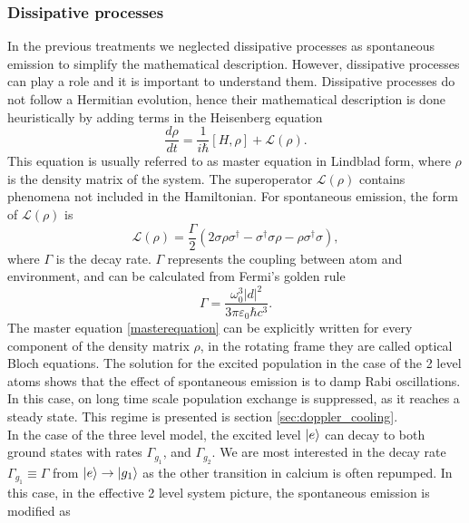 \subsubsection{Dissipative processes}
\label{sec:dissipation}
In the previous treatments we neglected dissipative processes as spontaneous emission to simplify the mathematical description. However, dissipative processes can play a role and it is important to understand them. Dissipative processes do not follow a Hermitian evolution, hence their mathematical description is done heuristically by adding terms in the Heisenberg equation
\begin{equation}
\label{masterequation}
\frac{d\rho}{dt} = \frac{1}{i\hbar}[H,\rho] + \mathcal{L}(\rho).
\end{equation}
This equation is usually referred to as master equation in Lindblad form, where $\rho$ is the density matrix of the system. The superoperator
$\mathcal{L}(\rho)$ contains phenomena not included in the Hamiltonian. For spontaneous emission, the form of $\mathcal{L}(\rho)$ is \cite{quantumnoise}
\begin{equation}
\mathcal{L}(\rho) = \frac{\Gamma}{2}(2\sigma \rho \sigma^\dagger -\sigma^\dagger\sigma \rho - \rho \sigma^\dagger \sigma),
\end{equation}
where $\Gamma$ is the decay rate. $\Gamma$ represents the coupling between atom and environment, and can be calculated from Fermi's golden rule \cite{doi:10.1142/p941}
\begin{equation}
\Gamma = \frac{\omega_0^3 |d|^2}{3\pi\varepsilon_0 \hbar c^3}.
\end{equation}
The master equation \eqref{masterequation} can be explicitly written for every component of the density matrix $\rho$,
in the rotating frame they are called optical Bloch equations. The solution for the excited population in the case of the 2 level atoms shows that the effect of spontaneous emission is to damp Rabi oscillations. In this case, on long time scale population exchange is suppressed, as it reaches a steady state. This regime is presented is section \ref{sec:doppler_cooling}.\\
In the case of the three level model, the excited level $\ket{e}$ can decay to both ground states with rates $\Gamma_{g_1}$, and $\Gamma_{g_2}$. We are most interested in the decay rate $\Gamma_{g_1} \equiv \Gamma$ from $\ket{e}\to\ket{g_1}$ as the other transition in calcium is often repumped. In this case, in the effective 2 level system picture, the spontaneous emission is modified as \cite{russo}
